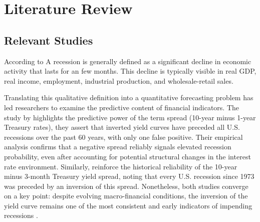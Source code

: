 

\section{Literature Review}

\begin{comment}
    

\begin{itemize}
    \item Relevant Studies: Summarize the key literature in your field that informs your project.
    \item Gaps in Research: Identify where there is a lack of information or unaddressed problems in the current literature.
    \item Theoretical Framework: Discuss the theories or models you used to guide your project (if applicable).
\end{itemize}
\end{comment}

\subsection{Relevant Studies}

According to \textcite{NBERRecession}
A recession is generally defined as a significant decline in economic activity that lasts for an few months. This decline is typically visible in real GDP, real income, employment, industrial production, and wholesale-retail sales.

Translating this qualitative definition into a quantitative forecasting problem has led researchers to examine the predictive content of financial indicators. %
The study by \textcite{bauer2018economic} highlights the predictive power of the term spread (10-year minus 1-year Treasury rates), they assert that inverted yield curves have preceded all U.S. recessions over the past 60 years, with only one false positive. Their empirical analysis confirms that a negative spread reliably signals elevated recession probability, even after accounting for potential structural changes in the interest rate environment.
Similarly, \textcite{aramonte2019yield} reinforce the historical reliability of the 10-year minus 3-month Treasury yield spread, noting that every U.S. recession since 1973 was preceded by an inversion of this spread. %
Nonetheless, both studies converge on a key point: despite evolving macro-financial conditions, the inversion of the yield curve remains one of the most consistent and early indicators of impending recessions \parencite{bauer2018economic, aramonte2019yield}.


